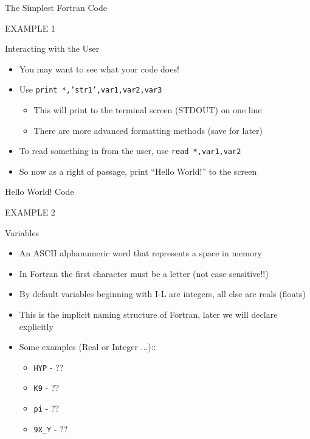 \documentclass{beamer}
\begin{document}
\begin{frame}{The Simplest Fortran Code}
\vfill
\begin{center}
  \Huge{EXAMPLE 1}
\end{center}
\vfill
\end{frame}
\begin{frame}{Interacting with the User}
\begin{itemize}
  \item You may want to see what your code does!
  \vfill\item Use \texttt{print *,'str1',var1,var2,var3}
    \begin{itemize}
      \item This will print to the terminal screen (STDOUT) on one line 
      \item There are more advanced formatting methods (save for later)
    \end{itemize}
  \vfill\item To read something in from the user, use \texttt{read *,var1,var2}
  \vfill\item So now as a right of passage, print ``Hello World!'' to the screen
\end{itemize}
\end{frame}
\begin{frame}{Hello World! Code}
 \begin{center}
  \Huge{EXAMPLE 2}
\end{center}
\end{frame}
\begin{frame}{Variables}
\begin{itemize}
  \item An ASCII alphanumeric word that represents a space in memory
  \item In Fortran the first character must be a letter (not case sensitive!!)
  \item By default variables beginning with I-L are integers, all else are reals (floats)
  \item This is the implicit naming structure of Fortran, later we will declare explicitly
  \item Some examples (Real or Integer ...)::
    \begin{itemize}
      \item \texttt{HYP} - ??
      \item \texttt{K9} - ??
      \item \texttt{pi} - ??
      \item \texttt{9X\_Y} - ??
    \end{itemize}
\end{itemize}
\end{frame}
\end{document}
